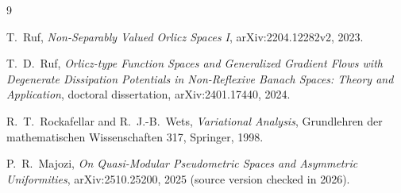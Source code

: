 \documentclass[11pt]{article}
\theoremstyle{definition}
\begin{document}
\sloppy
\begin{thebibliography}{9}

T.~Ruf,
\emph{Non-Separably Valued Orlicz Spaces I},
arXiv:2204.12282v2, 2023.

T.~D.~Ruf,
\emph{Orlicz-type Function Spaces and Generalized Gradient Flows with
Degenerate Dissipation Potentials in Non-Reflexive Banach Spaces: Theory and
Application},
doctoral dissertation, arXiv:2401.17440, 2024.

R.~T.~Rockafellar and R.~J.-B.~Wets,
\emph{Variational Analysis},
Grundlehren der mathematischen Wissenschaften 317, Springer, 1998.

P.~R.~Majozi,
\emph{On Quasi-Modular Pseudometric Spaces and Asymmetric Uniformities},
arXiv:2510.25200, 2025 (source version checked in 2026).

\end{thebibliography}
\fussy
\end{document}
